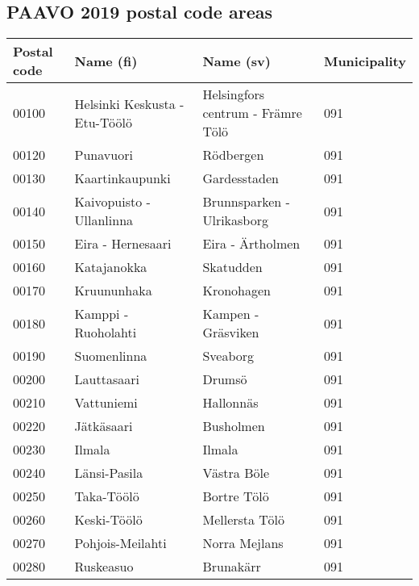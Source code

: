 \subsection{PAAVO 2019 postal code areas}
\justify

\begin{center}
    \begin{longtable}{|l l l l|} 
        \hline
        Postal code & Name (fi) & Name (sv) & Municipality \\ [0.5ex]
        \hline\hline
        \endhead %
        00100 & Helsinki Keskusta - Etu-Töölö & Helsingfors centrum - Främre Tölö & 091 \\ [0.5 ex] \hline
        00120 & Punavuori & Rödbergen & 091 \\ [0.25ex] \hline
        00130 & Kaartinkaupunki & Gardesstaden & 091 \\ [0.25ex] \hline
        00140 & Kaivopuisto - Ullanlinna & Brunnsparken - Ulrikasborg & 091 \\ [0.25ex] \hline
        00150 & Eira - Hernesaari & Eira - Ärtholmen & 091 \\ [0.25ex] \hline
        00160 & Katajanokka & Skatudden & 091 \\ [0.25ex] \hline
        00170 & Kruununhaka & Kronohagen & 091 \\ [0.25ex] \hline
        00180 & Kamppi - Ruoholahti & Kampen - Gräsviken & 091  \\ [0.25ex] \hline
        00190 & Suomenlinna & Sveaborg & 091 \\ [0.25ex] \hline
        00200 & Lauttasaari & Drumsö & 091 \\ [0.25ex] \hline
        00210 & Vattuniemi & Hallonnäs & 091 \\ [0.25ex] \hline
        00220 & Jätkäsaari & Busholmen & 091 \\ [0.25ex] \hline
        00230 & Ilmala & Ilmala & 091 \\ [0.25ex] \hline
        00240 & Länsi-Pasila & Västra Böle & 091 \\ [0.25ex] \hline
        00250 & Taka-Töölö & Bortre Tölö & 091 \\ [0.25ex] \hline
        00260 & Keski-Töölö & Mellersta Tölö & 091 \\ [0.25ex] \hline
        00270 & Pohjois-Meilahti & Norra Mejlans & 091 \\ [0.25ex] \hline
        00280 & Ruskeasuo & Brunakärr & 091 \\ [0.25ex] \hline

\end{longtable}
\end{center}
